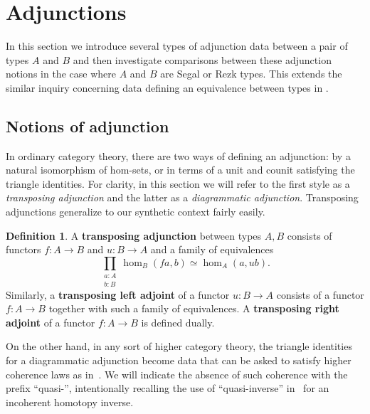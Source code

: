 \documentclass[12pt]{amsart}
\theoremstyle{plain}
\theoremstyle{definition}
\newtheorem{defn}[thm]{Definition}
\theoremstyle{remark}
\numberwithin{equation}{section}
\begin{document}
\section{Adjunctions}
\label{sec:adjunctions}

In this section we introduce several types of adjunction data between a pair of types $A$ and $B$ and then investigate comparisons between these adjunction notions in the case where $A$ and $B$ are Segal or Rezk types. This extends the similar inquiry concerning data defining an equivalence between types in \cite[Chapter 4]{hottbook}.

\subsection{Notions of adjunction}
\label{sec:notions-adjunction}

In ordinary category theory, there are two ways of defining an adjunction: by a natural isomorphism of hom-sets, or in terms of a unit and counit satisfying the triangle identities.
For clarity, in this section we will refer to the first style as a \emph{transposing adjunction} and the latter as a \emph{diagrammatic adjunction}.
Transposing adjunctions generalize to our synthetic context fairly easily.

\begin{defn}
  A \textbf{transposing adjunction} between types $A,B$ consists of functors $f:A\to B$ and $u:B\to A$ and a family of equivalences
  \[ \prod_{\substack{a:A\\ b:B}} \hom_B(fa,b) \simeq \hom_A(a,ub). \]
  Similarly, a \textbf{transposing left adjoint} of a functor $u:B\to A$ consists of a functor $f:A\to B$ together with such a family of equivalences. A \textbf{transposing right adjoint} of a functor $f \colon A \to B$ is defined dually.
\end{defn}

On the other hand, in any sort of higher category theory, the triangle identities for a diagrammatic adjunction become data that can be asked to satisfy higher coherence laws as in~\cite{RVadj}.
We will indicate the absence of such coherence with the prefix ``quasi-'', intentionally recalling the use of ``quasi-inverse'' in~\cite{hottbook} for an incoherent homotopy inverse.
\end{document}
